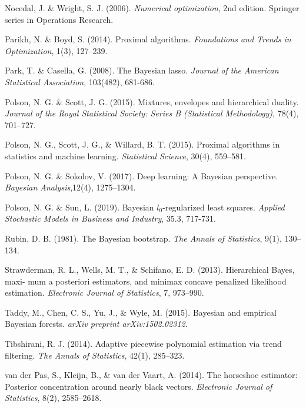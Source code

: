 \documentclass[12pt]{TD-CJS}
\begin{document}
\begin{thebibliography}{}
Nocedal, J. \& Wright, S. J. (2006). {\em Numerical optimization}, 2nd edition. Springer series in Operations Research.

Parikh, N. \&  Boyd, S. (2014). Proximal algorithms. {\it Foundations and Trends in Optimization}, 1(3), 127--239.

Park, T. \& Casella, G. (2008). The Bayesian lasso. {\it Journal of the American Statistical Association}, 103(482), 681-686.

Polson, N. G. \& Scott, J. G. (2015). Mixtures, envelopes and hierarchical duality. {\it Journal of the Royal Statistical Society: Series B (Statistical Methodology)},  78(4), 701--727.

Polson, N. G.,  Scott, J. G., \& Willard, B. T.  (2015). Proximal algorithms in statistics and machine learning. {\it Statistical Science}, 30(4), 559--581.

Polson, N. G. \& Sokolov, V. (2017). Deep learning: A Bayesian perspective. {\it Bayesian Analysis},12(4), 1275--1304.

Polson, N. G. \& Sun, L. (2019). Bayesian $l_0$-regularized least squares. {\em Applied Stochastic Models in Business and 
 Industry},  35.3,  717-731.

Rubin, D. B. (1981). The Bayesian bootstrap. {\it The Annals of Statistics}, 9(1), 130--134.

Strawderman, R. L., Wells, M. T., \& Schifano, E. D. (2013). Hierarchical Bayes, maxi- mum a posteriori estimators, and minimax concave penalized likelihood estimation. {\it Electronic Journal of Statistics}, 7, 973--990.

Taddy, M.,  Chen, C. S., Yu, J.,  \& Wyle, M. (2015). Bayesian and empirical Bayesian forests. {\it arXiv preprint arXiv:1502.02312}.

Tibshirani, R. J. (2014). Adaptive piecewise polynomial estimation via trend filtering. {\it The Annals of Statistics}, 42(1), 285--323.

van der Pas, S., Kleijn, B.,   \& van der Vaart, A. (2014). The horseshoe estimator: Posterior concentration around nearly black vectors. {\it Electronic Journal of Statistics}, 8(2), 2585--2618.


\end{thebibliography}
\end{document}
